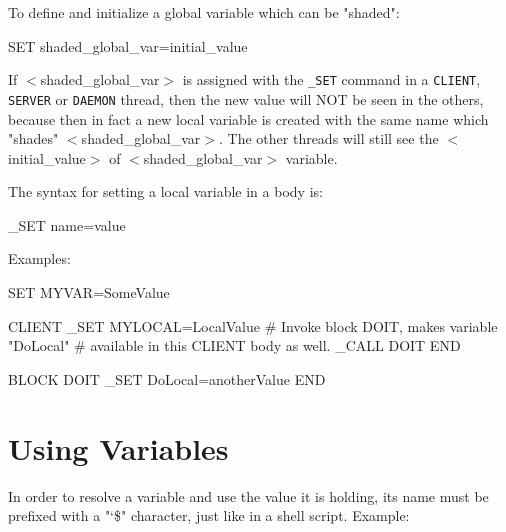 To define and initialize a global variable which can be "shaded":

\begin{usplisting}
    SET shaded_global_var=initial_value
\end{usplisting}

If $<$shaded\_global\_var$>$ is assigned with the \texttt{\_SET} command in a \texttt{CLIENT}, \texttt{SERVER} or \texttt{DAEMON} thread, then the new value will NOT be seen in the others, because then in fact a new local variable is created with the same name which "shades" $<$shaded\_global\_var$>$. The other threads will still see the $<$initial\_value$>$ of $<$shaded\_global\_var$>$ variable.

The syntax for setting a local variable in a body is:

\begin{usplisting}
    _SET name=value
\end{usplisting}

Examples:

\begin{usplisting}
    SET MYVAR=SomeValue
    
    CLIENT
    _SET MYLOCAL=LocalValue
    # Invoke block DOIT, makes variable "DoLocal"
    # available in this CLIENT body as well.
    _CALL DOIT
    END
    
    BLOCK DOIT
    _SET DoLocal=anotherValue
    END
\end{usplisting}

\newpage
\section{Using Variables}

In order to resolve a variable and use the value it is holding, 
its name must be prefixed with a "\char`\$" character, just like 
in a shell script. Example:


